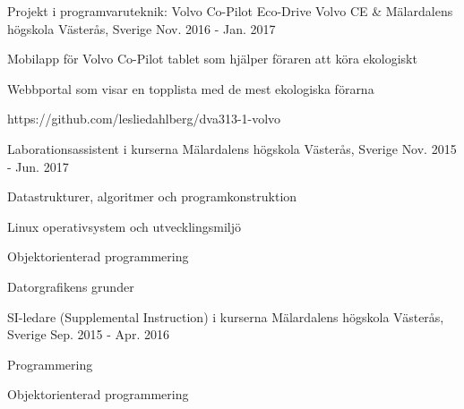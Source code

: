 

\begin{cventries}

  \cventry
    {Projekt i programvaruteknik: Volvo Co-Pilot Eco-Drive} %
    {Volvo CE \& Mälardalens högskola} %
    {Västerås, Sverige} %
    {Nov. 2016 - Jan. 2017} %
    {
      \begin{cvitems} %
        \item {Mobilapp för Volvo Co-Pilot tablet som hjälper föraren att köra ekologiskt}
        \item {Webbportal som visar en topplista med de mest ekologiska förarna}
        \item {https://github.com/lesliedahlberg/dva313-1-volvo}
      \end{cvitems}
    }


  \cventry
    {Laborationsassistent i kurserna} %
    {Mälardalens högskola} %
    {Västerås, Sverige} %
    {Nov. 2015 - Jun. 2017} %
    {
      \begin{cvitems} %
        \item {Datastrukturer, algoritmer och programkonstruktion}
        \item {Linux operativsystem och utvecklingsmiljö}
        \item {Objektorienterad programmering}
        \item {Datorgrafikens grunder}
      \end{cvitems}
    }

  \cventry
    {SI-ledare (Supplemental Instruction) i kurserna} %
    {Mälardalens högskola} %
    {Västerås, Sverige} %
    {Sep. 2015 - Apr. 2016} %
    {
      \begin{cvitems} %
        \item {Programmering}
        \item {Objektorienterad programmering}
      \end{cvitems}
    }


\end{cventries}
